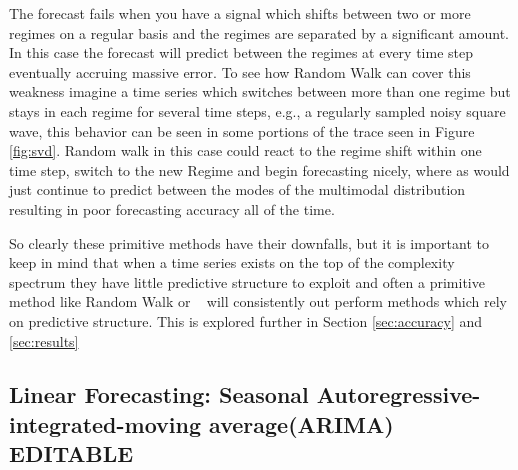 The \naive forecast fails when you have a signal which shifts between two or more regimes on a regular basis and the regimes are separated by a significant amount. In this case the \naive forecast will predict between the regimes at every time step eventually accruing massive error. To see how Random Walk can cover this weakness imagine a time series which switches between more than one regime but stays in each regime for several time steps, e.g., a regularly sampled noisy square wave, this behavior can be seen in some portions of the \svd trace seen in Figure \ref{fig:svd}. Random walk in this case could react to the regime shift within one time step, switch to the new Regime and begin forecasting nicely, where as \naive would just continue to predict between the modes of the multimodal distribution resulting in poor forecasting accuracy all of the time. 

So clearly these primitive methods have their downfalls, but it is important to keep in mind that when a time series exists on the top of the complexity spectrum they have little predictive structure to exploit and often a primitive method like Random Walk or \naive~ will consistently out perform methods which rely on predictive structure. This is explored further in Section \ref{sec:accuracy} and \ref{sec:results}


\subsection{Linear Forecasting: Seasonal Autoregressive-integrated-moving average(ARIMA){\color{blue} EDITABLE}}\label{sec:arima}




